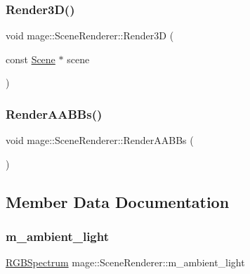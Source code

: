\hypertarget{classmage_1_1_scene_renderer_a5383182e4a0d2fc5e65d3ff57b3bd74f}{}\label{classmage_1_1_scene_renderer_a5383182e4a0d2fc5e65d3ff57b3bd74f} 
\subsubsection{\texorpdfstring{Render3\+D()}{Render3D()}}
{\footnotesize\ttfamily void mage\+::\+Scene\+Renderer\+::\+Render3D (\begin{DoxyParamCaption}\item[{const \hyperlink{classmage_1_1_scene}{Scene} $\ast$}]{scene }\end{DoxyParamCaption})\hspace{0.3cm}{\ttfamily [private]}}

\hypertarget{classmage_1_1_scene_renderer_ae74d45783f968f4d06a12f683861cb93}{}\label{classmage_1_1_scene_renderer_ae74d45783f968f4d06a12f683861cb93} 
\subsubsection{\texorpdfstring{Render\+A\+A\+B\+Bs()}{RenderAABBs()}}
{\footnotesize\ttfamily void mage\+::\+Scene\+Renderer\+::\+Render\+A\+A\+B\+Bs (\begin{DoxyParamCaption}{ }\end{DoxyParamCaption})\hspace{0.3cm}{\ttfamily [private]}}



\subsection{Member Data Documentation}
\hypertarget{classmage_1_1_scene_renderer_a2d6568c76b91600b16b273900732006c}{}\label{classmage_1_1_scene_renderer_a2d6568c76b91600b16b273900732006c} 
\subsubsection{\texorpdfstring{m\+\_\+ambient\+\_\+light}{m\_ambient\_light}}
{\footnotesize\ttfamily \hyperlink{structmage_1_1_r_g_b_spectrum}{R\+G\+B\+Spectrum} mage\+::\+Scene\+Renderer\+::m\+\_\+ambient\+\_\+light\hspace{0.3cm}{\ttfamily [private]}}

